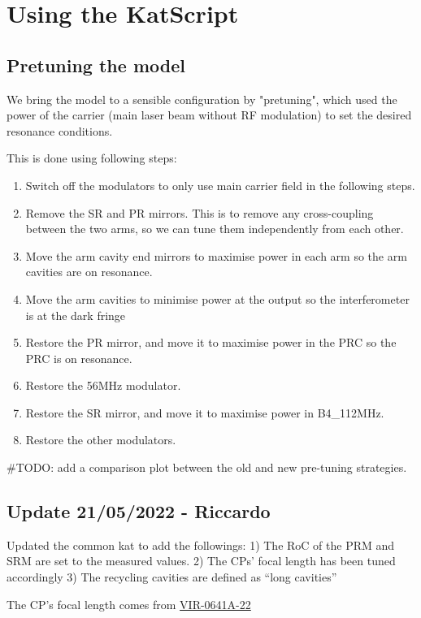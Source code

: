 \documentclass[color,DIV12,pdftex,a4paper]{virgo-note}
\begin{document}
\section{Using the KatScript}

\subsection{Pretuning the model}
We bring the model to a sensible configuration by "pretuning", which used the power of the carrier (main laser beam without RF modulation) to set the desired resonance conditions.

This is done using following steps:

\begin{enumerate}
  \item Switch off the modulators to only use main carrier field in the following steps.
  \item Remove the SR and PR mirrors. This is to remove any cross-coupling between the two arms, so we can tune them independently from each other.
  \item Move the arm cavity end mirrors to maximise power in each arm so the arm cavities are on resonance.
  \item Move the arm cavities to minimise power at the output so the interferometer is at the dark fringe
  \item Restore the PR mirror, and move it to maximise power in the PRC so the PRC is on resonance.
  \item Restore the 56MHz modulator.
  \item Restore the SR mirror, and move it to maximise power in B4\_112MHz.
  \item Restore the other modulators. 
\end{enumerate}

#TODO: add a comparison plot between the old and new pre-tuning strategies.

\subsection{Update 21/05/2022 - Riccardo}
Updated the common kat to add the followings:
1) The RoC of the PRM and SRM are set to the measured values.
2) The CPs’ focal length has been tuned accordingly
3) The recycling cavities are defined as “long cavities”

The CP's focal length comes from \href{https://tds.virgo-gw.eu/?content=3&r=20721}{VIR-0641A-22}
\end{document}
